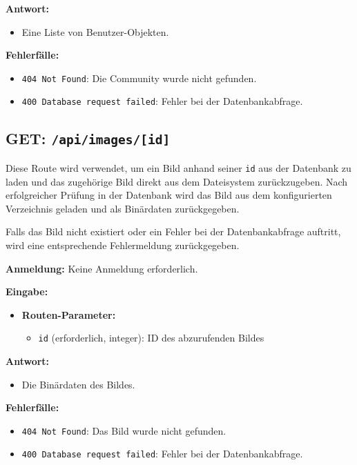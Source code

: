 \documentclass[a4paper,12pt]{article}
\begin{document}
\textbf{Antwort:}
\begin{itemize}
    \item Eine Liste von Benutzer-Objekten.
\end{itemize}

\textbf{Fehlerfälle:}
\begin{itemize}
    \item \texttt{404 Not Found}:
        Die Community wurde nicht gefunden.
    \item \texttt{400 Database request failed}:
        Fehler bei der Datenbankabfrage.
\end{itemize}

\newpage
\subsection{GET: \texttt{/api/images/[id]}}

Diese Route wird verwendet, um ein Bild anhand seiner \texttt{id} aus der
Datenbank zu laden und das zugehörige Bild direkt aus dem Dateisystem
zurückzugeben. Nach erfolgreicher Prüfung in der Datenbank wird das Bild aus
dem konfigurierten Verzeichnis geladen und als Binärdaten zurückgegeben.

Falls das Bild nicht existiert oder ein Fehler bei der Datenbankabfrage
auftritt, wird eine entsprechende Fehlermeldung zurückgegeben.

\textbf{Anmeldung:} Keine Anmeldung erforderlich.

\textbf{Eingabe:}
\begin{itemize}
    \item \textbf{Routen-Parameter:}
    \begin{itemize}
        \item \texttt{id} (erforderlich, integer):
            ID des abzurufenden Bildes
    \end{itemize}
\end{itemize}

\textbf{Antwort:}
\begin{itemize}
    \item Die Binärdaten des Bildes.
\end{itemize}

\textbf{Fehlerfälle:}
\begin{itemize}
    \item \texttt{404 Not Found}:
        Das Bild wurde nicht gefunden.
    \item \texttt{400 Database request failed}:
        Fehler bei der Datenbankabfrage.
\end{itemize}
\end{document}
